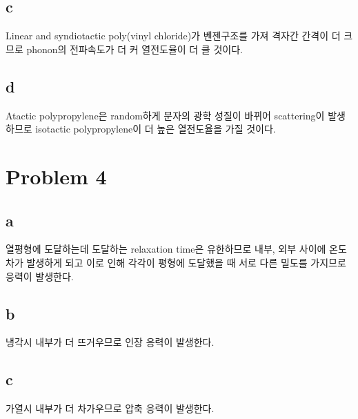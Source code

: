 \documentclass[a4paper]{oblivoir}
\begin{document}
\subsection{c}
Linear and syndiotactic poly(vinyl chloride)가 벤젠구조를 가져 격자간 간격이 더 크므로 phonon의 전파속도가 더 커 열전도율이 더 클 것이다.

\subsection{d}
Atactic polypropylene은 random하게 분자의 광학 성질이 바뀌어 scattering이 발생하므로 isotactic polypropylene이 더 높은 열전도율을 가질 것이다.

\section{Problem 4}
\subsection{a}
열평형에 도달하는데 도달하는 relaxation time은 유한하므로 내부, 외부 사이에 온도차가 발생하게 되고 이로 인해 각각이 평형에 도달했을 때 서로 다른 밀도를 가지므로 응력이 발생한다.

\subsection{b}
냉각시 내부가 더 뜨거우므로 인장 응력이 발생한다.

\subsection{c}
가열시 내부가 더 차가우므로 압축 응력이 발생한다.

\end{document}
